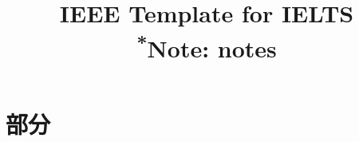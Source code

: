 \documentclass[conference]{IEEEtran}
\begin{document}
\title{IEEE Template for IELTS\\
{\footnotesize \textsuperscript{*}Note:
notes}
}

\author{
}

\maketitle


\section{部分}
\end{document}
